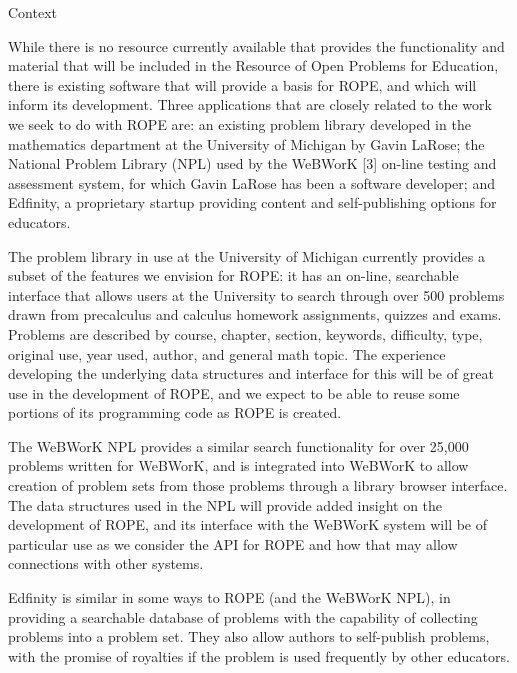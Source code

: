 \documentclass[11pt]{article}
\begin{document}
\begin{section}{Context}

While there is no resource currently available that provides the
functionality and material that will be included in the Resource of Open
Problems for Education, there is existing software that will provide a basis for ROPE,
and which will inform its development.  Three applications that are closely
related to the work we seek to do with ROPE are: an existing problem
library developed in the mathematics department at the University of
Michigan by Gavin LaRose; the National Problem Library (NPL) used by
the WeBWorK [3] %
on-line testing and assessment system, for
which Gavin LaRose has been a software developer; and Edfinity, a  
proprietary startup providing content and self-publishing options
for educators.

The problem library in use at the University of Michigan currently
provides a subset of the features we envision for ROPE: it has an
on-line, searchable interface that allows users at the University to
search through over 500 problems drawn from precalculus and calculus
homework assignments, quizzes and exams.  Problems are described by
course, chapter, section, keywords, difficulty, type, original use, year
used, author, and general math topic.  The experience developing the
underlying data structures and interface for this will be of great use in
the development of ROPE, and we expect to be able to reuse some
portions of its programming code as ROPE is created.  

The WeBWorK NPL
provides a similar search functionality for over 25,000 problems written
for WeBWorK, and is integrated into WeBWorK to allow creation of problem
sets from those problems through a library browser interface.  The data
structures used in the NPL will provide added insight on the development
of ROPE, and its interface with the WeBWorK system will be of
particular use as we consider the API for ROPE and how that may allow
connections with other systems.

Edfinity is similar in some ways to ROPE (and the WeBWorK NPL), in
providing a searchable database of problems with the capability of 
collecting problems into a problem set.  They also allow authors to 
self-publish problems, with the promise of royalties if the problem is
used frequently by other educators.


\end{section}
\end{document}
